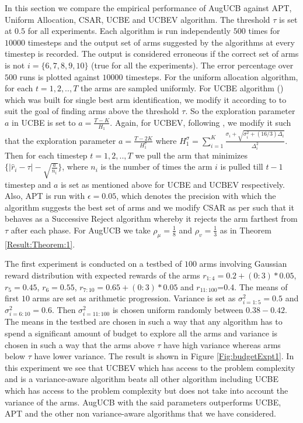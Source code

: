 

	In this section we compare the empirical performance of AugUCB against APT, Uniform Allocation, CSAR, UCBE and UCBEV algorithm. The threshold $\tau$ is set at $0.5$ for all experiments. Each algorithm is run independently $500$ times for $10000$ timesteps and the output set of arms suggested by the algorithms at every timestep is recorded. The output is considered erroneous if the correct set of arms is not $i=\lbrace 6,7,8,9,10 \rbrace$ (true for all the experiments). The error percentage over $500$ runs is plotted against $10000$ timesteps. For the uniform allocation algorithm, for each $t=1,2,..,T$ the arms are sampled uniformly. For UCBE algorithm (\cite{audibert2009exploration}) which was built for single best arm identification, we modify it according to \cite{locatelli2016optimal} to suit the goal of finding arms above the threshold $\tau$. So the exploration parameter $a$ in UCBE is set to $a=\frac{T-K}{H_1}$. Again, for UCBEV, following \cite{gabillon2011multi}, we modify it such that the exploration parameter $a = \frac{T-2K}{H_{1}^{\sigma}}$ where $H_{1}^{\sigma}=\sum_{i=1}^{K}\frac{\sigma_{i}+\sqrt{\sigma_{i}^{2}+(16/3)\Delta_{i}}}{\Delta_{i}^{2}}$. Then for each timestep $t=1,2,..,T$ we pull the arm that minimizes $\lbrace |\hat{r}_{i} -\tau|-\sqrt{\frac{a}{n_{i}}} \rbrace$, where $n_{i}$ is the number of times the arm $i$ is pulled till $t-1$ timestep and $a$ is set as mentioned above for UCBE and UCBEV respectively. Also, APT is run with $\epsilon=0.05$, which denotes the precision with which the algorithm suggests the best set of arms and we modify CSAR as per \cite{locatelli2016optimal} such that it behaves as a Successive Reject algorithm whereby it rejects the arm farthest from $\tau$ after each phase. For AugUCB we take $\rho_{\mu}=\frac{1}{8}$ and $\rho_v=\frac{1}{3}$ as in Theorem \ref{Result:Theorem:1}.
	
	The first experiment is conducted on a testbed of $100$ arms involving Gaussian reward distribution with expected rewards of the arms $r_{1:4}=0.2+(0:3)*0.05$, $r_{5}=0.45$, $r_{6}=0.55$, $r_{7:10}=0.65+(0:3)*0.05$ and $r_{11:100}$=0.4. The means of first $10$ arms are set as arithmetic progression. Variance is set as $\sigma_{i=1:5}^{2}=0.5$ and $\sigma_{i=6:10}^{2}=0.6$. Then $\sigma_{i=11:100}^{2}$ is chosen uniform randomly between $0.38-0.42$. The means in the testbed are chosen in such a way that any algorithm has to spend a significant amount of budget to explore all the arms and variance is chosen in such a way that the arms above $\tau$ have high variance whereas arms below $\tau$ have lower variance. The result is shown in Figure \ref{Fig:budgetExpt1}. In this experiment we see that UCBEV which has access to the problem complexity and is a variance-aware algorithm beats all other algorithm including UCBE which has access to the problem complexity but does not take into account the variance of the arms. AugUCB with the said parameters outperforms UCBE, APT and the other non variance-aware algorithms that we have considered. 
	
